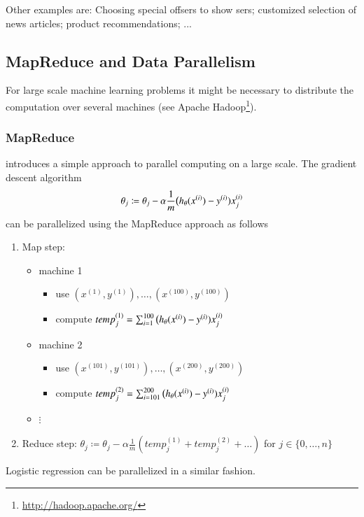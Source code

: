 \documentclass[a4paper,twoside,10pt]{article}
\begin{document}
Other examples are: Choosing special offsers to show sers; customized selection of news articles; product recommendations; ...

\subsection{MapReduce and Data Parallelism}
For large scale machine learning problems it might be necessary to distribute the computation over several machines (see Apache Hadoop\footnote{\url{http://hadoop.apache.org/}}).

\subsubsection{MapReduce}
\citep{mapreduce} introduces a simple approach to parallel computing on a large scale.
The gradient descent algorithm
\begin{equation*}
  \theta_j\coloneqq\theta_j-\alpha\frac{1}{m}\big(h_\theta(x^{(i)})-y^{(i)})x^{(i)}_j
\end{equation*}
can be parallelized using the MapReduce approach as follows
\begin{enumerate}
  \item Map step:
    \begin{itemize}
      \item machine 1
        \begin{itemize}
          \item use $(x^{(1)},y^{(1)}),\ldots,(x^{(100)},y^{(100)})$
          \item compute $temp^{(1)}_j=\sum_{i=1}^{100}\big(h_\theta(x^{(i)})-y^{(i)})x^{(i)}_j$
        \end{itemize}
      \item machine 2
        \begin{itemize}
          \item use $(x^{(101)},y^{(101)}),\ldots,(x^{(200)},y^{(200)})$
          \item compute $temp^{(2)}_j=\sum_{i=101}^{200}\big(h_\theta(x^{(i)})-y^{(i)})x^{(i)}_j$
        \end{itemize}
      \item $\vdots$
    \end{itemize}
  \item Reduce step: $\theta_j\coloneqq\theta_j-\alpha\frac{1}{m}(temp^{(1)}_j+temp^{(2)}_j+\ldots)$ for $j\in\{0,\ldots,n\}$
\end{enumerate}
Logistic regression can be parallelized in a similar fashion.
\end{document}
